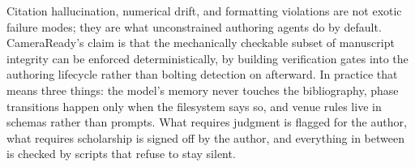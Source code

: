 \documentclass[conference]{IEEEtran}
\begin{document}
Citation hallucination, numerical drift, and formatting violations are not exotic failure modes; they are what unconstrained authoring agents do by default. CameraReady's claim is that the mechanically checkable subset of manuscript integrity can be enforced deterministically, by building verification gates into the authoring lifecycle rather than bolting detection on afterward. In practice that means three things: the model's memory never touches the bibliography, phase transitions happen only when the filesystem says so, and venue rules live in schemas rather than prompts. What requires judgment is flagged for the author, what requires scholarship is signed off by the author, and everything in between is checked by scripts that refuse to stay silent.
\newpage
\label{ReferencesStart}


\end{document}
